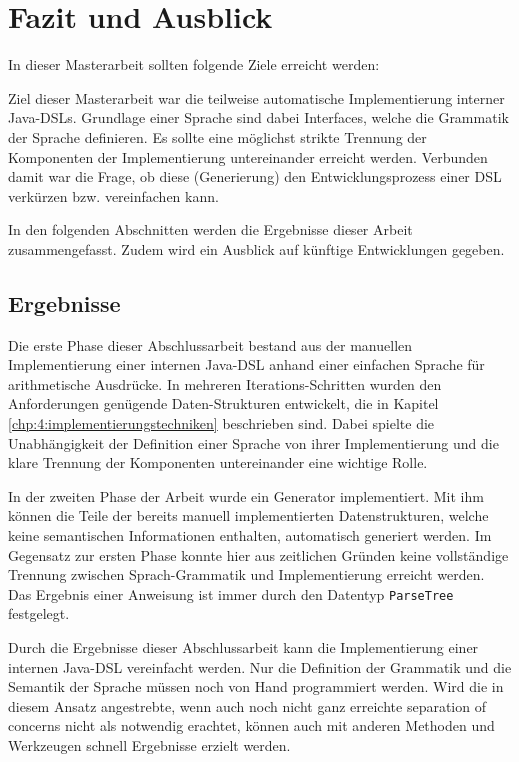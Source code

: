 
\chapter{Fazit und Ausblick}\label{chp:7:fazit}
In dieser Masterarbeit sollten folgende Ziele erreicht werden:

Ziel dieser Masterarbeit war die teilweise automatische Implementierung interner Java-DSLs. Grundlage einer Sprache sind dabei Interfaces, welche die Grammatik der Sprache definieren. Es sollte eine möglichst strikte Trennung der Komponenten der Implementierung untereinander erreicht werden. Verbunden damit war die Frage, ob diese (Generierung) den Entwicklungsprozess einer DSL verkürzen bzw. vereinfachen kann.

In den folgenden Abschnitten werden die Ergebnisse dieser Arbeit zusammengefasst. Zudem wird ein Ausblick auf künftige Entwicklungen gegeben.

\section{Ergebnisse}\label{sct:7.1:ergebnisse}
Die erste Phase dieser Abschlussarbeit bestand aus der manuellen Implementierung einer internen Java-DSL anhand einer einfachen Sprache für arithmetische Ausdrücke. In mehreren Iterations-Schritten wurden den Anforderungen genügende Daten-Strukturen entwickelt, die in Kapitel \ref{chp:4:implementierungstechniken} beschrieben sind.
Dabei spielte die Unabhängigkeit der Definition einer Sprache von ihrer Implementierung und die klare Trennung der Komponenten untereinander eine wichtige Rolle.

In der zweiten Phase der Arbeit wurde ein Generator implementiert. Mit ihm können die Teile der bereits manuell implementierten Datenstrukturen, welche keine semantischen Informationen enthalten, automatisch generiert werden.
Im Gegensatz zur ersten Phase konnte hier aus zeitlichen Gründen keine vollständige Trennung zwischen Sprach-Grammatik und Implementierung erreicht werden. Das Ergebnis einer Anweisung ist immer durch den Datentyp \texttt{ParseTree} festgelegt.

Durch die Ergebnisse dieser Abschlussarbeit kann die Implementierung einer internen Java-DSL vereinfacht werden. Nur die Definition der Grammatik und die Semantik der Sprache müssen noch von Hand programmiert werden. Wird die in diesem Ansatz angestrebte, wenn auch noch nicht ganz erreichte separation of concerns nicht als notwendig erachtet, können auch mit anderen Methoden und Werkzeugen schnell Ergebnisse erzielt werden.

